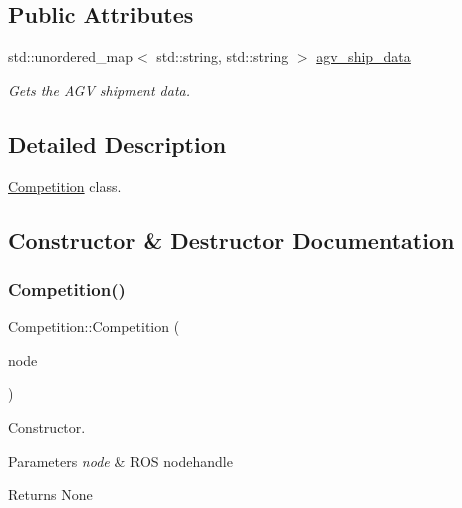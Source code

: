 \subsection*{Public Attributes}
\begin{DoxyCompactItemize}
\item 
std\+::unordered\+\_\+map$<$ std\+::string, std\+::string $>$ \hyperlink{classCompetition_a29e55fbb84b665c374f53113cf3fa2ca}{agv\+\_\+ship\+\_\+data}
\begin{DoxyCompactList}\small\item\em Gets the A\+GV shipment data. \end{DoxyCompactList}\end{DoxyCompactItemize}


\subsection{Detailed Description}
\hyperlink{classCompetition}{Competition} class. 

\subsection{Constructor \& Destructor Documentation}
\mbox{\label{classCompetition_a3d8b50d07d2424bd18743148237da31c}} 
\subsubsection{\texorpdfstring{Competition()}{Competition()}}
{\footnotesize\ttfamily Competition\+::\+Competition (\begin{DoxyParamCaption}\item[{ros\+::\+Node\+Handle \&}]{node }\end{DoxyParamCaption})\hspace{0.3cm}{\ttfamily [explicit]}}



Constructor. 


\begin{DoxyParams}{Parameters}
{\em node} & R\+OS nodehandle \\
\hline
\end{DoxyParams}
\begin{DoxyReturn}{Returns}
None 
\end{DoxyReturn}


